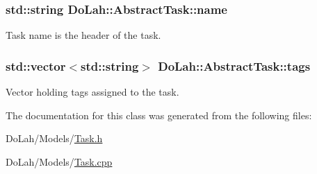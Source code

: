 \subsubsection[{name}]{\setlength{\rightskip}{0pt plus 5cm}std\+::string Do\+Lah\+::\+Abstract\+Task\+::name\hspace{0.3cm}{\ttfamily [private]}}\label{class_do_lah_1_1_abstract_task_a0d5e0174ffcd6b8e0f152130ede57fcb}


Task name is the header of the task. 

\hypertarget{class_do_lah_1_1_abstract_task_aeffd99b2d49c068eaff0fe305464546d}{}
\subsubsection[{tags}]{\setlength{\rightskip}{0pt plus 5cm}std\+::vector$<$std\+::string$>$ Do\+Lah\+::\+Abstract\+Task\+::tags\hspace{0.3cm}{\ttfamily [private]}}\label{class_do_lah_1_1_abstract_task_aeffd99b2d49c068eaff0fe305464546d}


Vector holding tags assigned to the task. 



The documentation for this class was generated from the following files\+:\begin{DoxyCompactItemize}
\item 
Do\+Lah/\+Models/\hyperlink{_task_8h}{Task.\+h}\item 
Do\+Lah/\+Models/\hyperlink{_task_8cpp}{Task.\+cpp}\end{DoxyCompactItemize}
